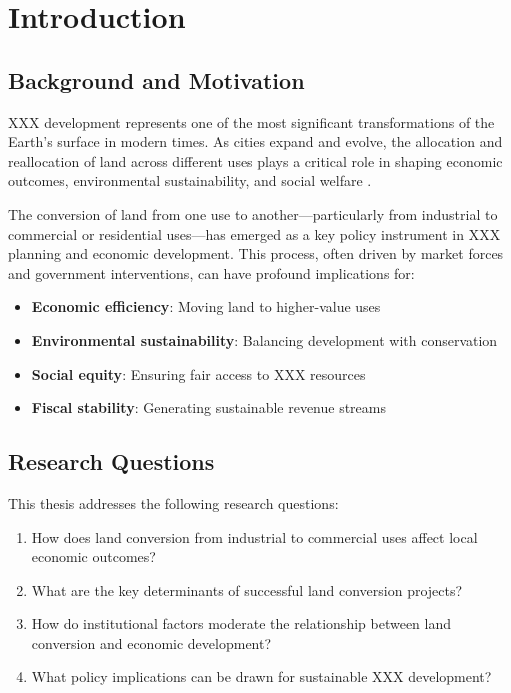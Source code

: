 \chapter{Introduction}
\label{ch:introduction}

\section{Background and Motivation}

XXX development represents one of the most significant transformations of the Earth's surface in modern times. As cities expand and evolve, the allocation and reallocation of land across different uses plays a critical role in shaping economic outcomes, environmental sustainability, and social welfare \citep{smith2023_XXX_land, jones2022_land_economics}.

The conversion of land from one use to another---particularly from industrial to commercial or residential uses---has emerged as a key policy instrument in XXX planning and economic development. This process, often driven by market forces and government interventions, can have profound implications for:

\begin{itemize}
    \item \textbf{Economic efficiency}: Moving land to higher-value uses
    \item \textbf{Environmental sustainability}: Balancing development with conservation
    \item \textbf{Social equity}: Ensuring fair access to XXX resources
    \item \textbf{Fiscal stability}: Generating sustainable revenue streams
\end{itemize}

\section{Research Questions}

This thesis addresses the following research questions:

\begin{enumerate}
    \item How does land conversion from industrial to commercial uses affect local economic outcomes?
    \item What are the key determinants of successful land conversion projects?
    \item How do institutional factors moderate the relationship between land conversion and economic development?
    \item What policy implications can be drawn for sustainable XXX development?
\end{enumerate}

